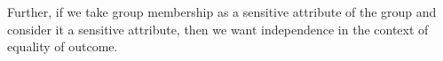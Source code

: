 Further, if we take group membership as a sensitive attribute of the group and consider it a sensitive attribute, then we want independence in the context of equality of outcome.



